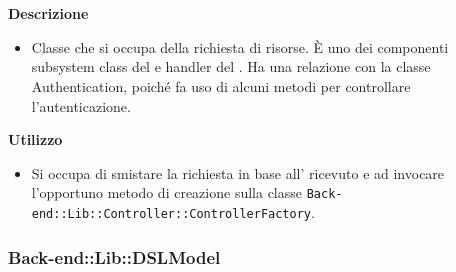         \textbf{\\ \\ Descrizione} 
          \begin{itemize}
            \item[] Classe che si occupa della richiesta di risorse. È uno dei componenti subsystem class del   e handler del  . Ha una relazione con la classe Authentication, poiché fa uso di alcuni metodi per controllare l'autenticazione.
          \end{itemize}      
        \textbf{Utilizzo}  
          \begin{itemize}
            \item[] Si occupa di smistare la richiesta in base all' ricevuto e ad invocare l'opportuno metodo di creazione sulla classe \texttt{Back-end::Lib::Controller::ControllerFactory}.
          \end{itemize}
  \subsubsection{Back-end::Lib::DSLModel}
